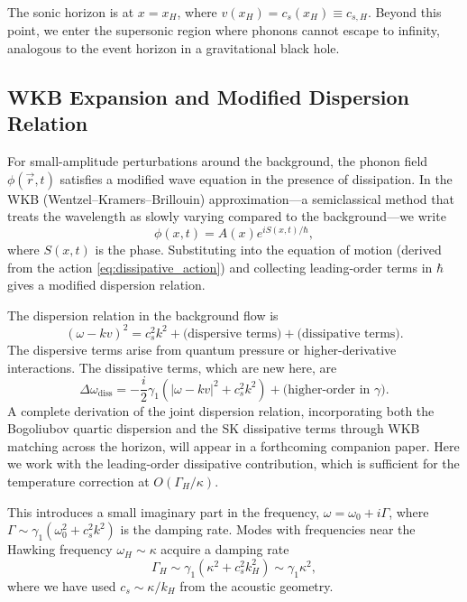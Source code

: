 \documentclass[aps,prl,twocolumn,superscriptaddress,nofootinbib,amsmath,amssymb]{revtex4-2}
\begin{document}
The sonic horizon is at $x = x_H$, where $v(x_H) = c_s(x_H) \equiv c_{s,H}$. Beyond this point, we enter the supersonic region where phonons cannot escape to infinity, analogous to the event horizon in a gravitational black hole.

\subsection{WKB Expansion and Modified Dispersion Relation}

For small-amplitude perturbations around the background, the phonon field $\phi(\vec{r}, t)$ satisfies a modified wave equation in the presence of dissipation. In the WKB (Wentzel--Kramers--Brillouin) approximation---a semiclassical method that treats the wavelength as slowly varying compared to the background---we write
\begin{equation}
\label{eq:wkb_ansatz}
\phi(x, t) = A(x) e^{iS(x,t)/\hbar},
\end{equation}
where $S(x,t)$ is the phase. Substituting into the equation of motion (derived from the action \eqref{eq:dissipative_action}) and collecting leading-order terms in $\hbar$ gives a modified dispersion relation.

The dispersion relation in the background flow is
\begin{equation}
\label{eq:dispersion_relation}
(\omega - k v)^2 = c_s^2 k^2 + \text{(dispersive terms)} + \text{(dissipative terms)}.
\end{equation}
The dispersive terms arise from quantum pressure or higher-derivative interactions. The dissipative terms, which are new here, are
\begin{equation}
\label{eq:dissipative_dispersion}
\Delta \omega_{\text{diss}} = -\frac{i}{2}\gamma_1 (|\omega - kv|^2 + c_s^2 k^2) + \text{(higher-order in } \gamma \text{)}.
\end{equation}
A complete derivation of the joint dispersion relation, incorporating both the Bogoliubov quartic dispersion and the SK dissipative terms through WKB matching across the horizon, will appear in a forthcoming companion paper. Here we work with the leading-order dissipative contribution, which is sufficient for the temperature correction at $O(\Gamma_H/\kappa)$.

This introduces a small imaginary part in the frequency, $\omega = \omega_0 + i\Gamma$, where $\Gamma \sim \gamma_1 (\omega_0^2 + c_s^2 k^2)$ is the damping rate. Modes with frequencies near the Hawking frequency $\omega_H \sim \kappa$ acquire a damping rate
\begin{equation}
\label{eq:hawking_damping}
\Gamma_H \sim \gamma_1 (\kappa^2 + c_s^2 k_H^2) \sim \gamma_1 \kappa^2,
\end{equation}
where we have used $c_s \sim \kappa / k_H$ from the acoustic geometry.
\end{document}
